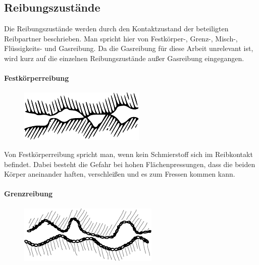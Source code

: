 \subsection{Reibungszustände}
\label{sub:reibungszustaende}

Die Reibungszustände werden durch den Kontaktzustand der beteiligten Reibpartner beschrieben.
Man spricht hier von Festkörper-, Grenz-, Misch-, Flüssigkeits- und Gasreibung.
Da die Gasreibung für diese Arbeit unrelevant ist, wird kurz auf die einzelnen Reibungszustände außer Gasreibung eingegangen.

\paragraph{Festkörperreibung}
\label{par:festkoerperreibung}
%
\begin{figure}
    \includegraphics[trim={0 1cm 0 1cm}]{./images/festkoerperreibung.pdf}
\end{figure}

Von Festkörperreibung spricht man, wenn kein Schmierstoff sich im Reibkontakt befindet.
Dabei besteht die Gefahr bei hohen Flächenpressungen, dass die beiden Körper aneinander haften, verschleißen und es zum Fressen kommen kann.

\paragraph{Grenzreibung}
\label{par:grenzreibung}
%
\begin{figure}
    \includegraphics[trim={0 0.5cm 0 0.5cm}]{./images/grenzreibung.pdf}
\end{figure}


